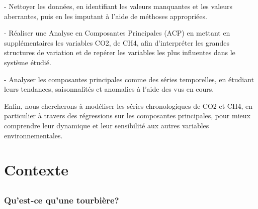 \documentclass[a4paper,12pt]{report}%
\begin{document}
\begin{justify}
- Nettoyer les données, en identifiant les valeurs manquantes et les valeurs aberrantes, puis en les imputant à l'aide de méthoses appropriées. \newline
					
- Réaliser une Analyse en Composantes Principales (ACP) en mettant en supplémentaires les variables CO2, de CH4, afin d’interpréter les grandes structures de variation et de repérer les variables les plus influentes dans le système étudié. \newline
					
- Analyser les composantes principales comme des séries temporelles, en étudiant leurs tendances, saisonnalités et anomalies à l'aide des vus en cours. \newline
					
Enfin, nous chercherons à modéliser les séries chronologiques de CO2 et CH4, en particulier à travers des régressions sur les composantes principales, pour mieux comprendre leur dynamique et leur sensibilité aux autres variables environnementales.

\end{justify}
\newpage

\part{Contexte}
\chapter*{}
\section{Qu'est-ce qu'une tourbière? }
\end{document}
